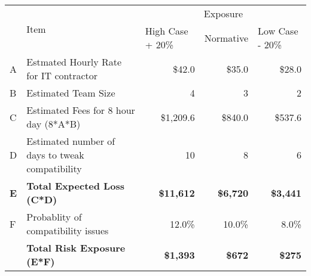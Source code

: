 \begin{table}[h]
\begin{tabularx}{\textwidth}{@{}lXrrr@{}}
\toprule
\multirow{2}{*}{} & \multirow{2}{*}{Item}                           & \multicolumn{3}{c}{Exposure}                                                                               \\ \cmidrule(l){3-5} 
                  &                                                 & \multicolumn{1}{l}{High Case + 20\%} & \multicolumn{1}{l}{Normative} & \multicolumn{1}{l}{Low Case - 20\%} \\ \midrule
A                 & Estmated Hourly Rate for IT contractor          & \$42.0                               & \$35.0                        & \$28.0                              \\
B                 & Estimated Team Size                             & 4                                    & 3                             & 2                                   \\
C                 & Estimated Fees for 8 hour day (8*A*B)           & \$1,209.6                            & \$840.0                       & \$537.6                             \\
D                 & Estimated number of days to tweak compatibility & 10                                   & 8                             & 6                                   \\
\textbf{E}        & \textbf{Total Expected Loss (C*D)}              & \textbf{\$11,612}                    & \textbf{\$6,720}              & \textbf{\$3,441}                    \\
F                 & Probablity of compatibility issues              & 12.0\%                               & 10.0\%                        & 8.0\%                               \\
\textbf{}         & \textbf{Total Risk Exposure (E*F)}              & \textbf{\$1,393}                     & \textbf{\$672}                & \textbf{\$275}              
\\ \bottomrule       
\end{tabularx}
\end{table}